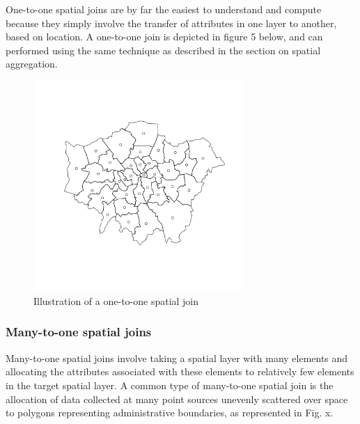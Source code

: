 \documentclass[]{article}
\let\Oldincludegraphics\includegraphics
\renewcommand{\includegraphics}[1]{\Oldincludegraphics[width=8cm]{#1}}
\begin{document}
One-to-one spatial joins are by far the easiest to understand and
compute because they simply involve the transfer of attributes in one
layer to another, based on location. A one-to-one join is depicted in
figure 5 below, and can performed using the same technique as described
in the section on spatial aggregation.

\begin{figure}[htbp]
\centering
\includegraphics{figure/Illustration_of_a_one-to-one_spatial_join_.png}
\caption{Illustration of a one-to-one spatial join}
\end{figure}

\subsubsection{Many-to-one spatial joins}

Many-to-one spatial joins involve taking a spatial layer with many
elements and allocating the attributes associated with these elements to
relatively few elements in the target spatial layer. A common type of
many-to-one spatial join is the allocation of data collected at many
point sources unevenly scattered over space to polygons representing
administrative boundaries, as represented in Fig. x.
\end{document}
